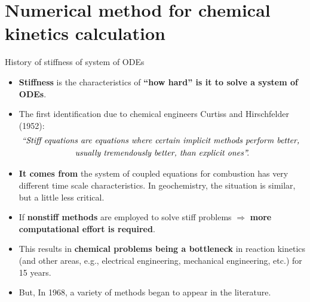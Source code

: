 \section{Numerical method for chemical kinetics calculation}
%
%
\begin{frame}{History of stiffness of system of ODEs}
	\begin{itemize}
		\item \alert{\bf Stiffness} is the characteristics of {\bf ``how hard'' is it to solve a system of ODEs}. 
		\pause
		\item The first identification due to chemical engineers 
		Curtiss and Hirschfelder (1952):\\[-20pt]
		\begin{multline*}
			\text{\emph{``Stiff equations are equations where certain implicit methods perform better, }} \\ 
			\text{\emph{usually tremendously better, than explicit ones''.}}
		\end{multline*}
		\vskip -10pt
		\pause
		\item \alert{\bf It comes from} the system of coupled equations for combustion has very different time scale characteristics. In geochemistry, the situation is similar, but a little less critical. 
	\pause
		\item If {\bf nonstiff methods} are employed to solve stiff problems $\Rightarrow$ {\bf more computational effort is required}.
		\pause
		\item This results in {\bf chemical problems being a bottleneck} in reaction kinetics (and other areas, e.g.,  electrical engineering, mechanical engineering, etc.) for 15 years.
		\pause
		\item But, In 1968, a variety of methods began to appear in the literature.
	\end{itemize}
\end{frame}
%
